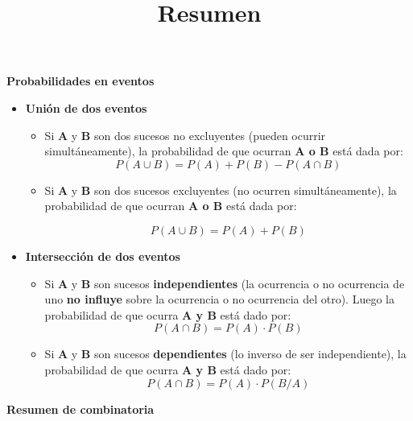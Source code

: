 \documentclass[letterpaper,11pt]{article} %
\title{\bfseries Resumen}
\author{}
\date{}
\begin{document}

\item \textbf{Probabilidades en eventos}

\begin{itemize}
\item \textbf{Unión de dos eventos}
\begin{itemize}
\item Si \textbf{A} y \textbf{B} son dos sucesos no excluyentes (pueden ocurrir simultáneamente), la probabilidad de que ocurran \textbf{A o B} está dada por:
\begin{equation*}\boxed{
P(A \cup B) = P(A) + P(B) - P(A \cap B)}
\end{equation*}

\item Si \textbf{A} y \textbf{B} son dos sucesos excluyentes (no ocurren simultáneamente), la probabilidad de que ocurran \textbf{A o B} está dada por:

\begin{equation*}\boxed{
P(A \cup B) = P(A) + P(B)}
\end{equation*}
\end{itemize}

\item \textbf{Intersección de dos eventos}
\begin{itemize}
\item Si \textbf{A} y \textbf{B} son sucesos \textbf{independientes} (la ocurrencia o no ocurrencia de uno \textbf{no influye} sobre la ocurrencia o no ocurrencia del otro). Luego la probabilidad de que ocurra \textbf{A y B} está dado por:
\begin{equation*}\boxed{
P(A \cap B) = P(A) \cdot P(B)}
\end{equation*}

\item Si \textbf{A} y \textbf{B} son sucesos \textbf{dependientes} (lo inverso de ser independiente), la probabilidad de que ocurra \textbf{A y B} está dado por:
\begin{equation*}\boxed{
P(A \cap B) = P(A) \cdot P(B/A)}
\end{equation*}

\end{itemize}

\end{itemize}
\newpage
\item \textbf{Resumen de combinatoria}
\end{document}

